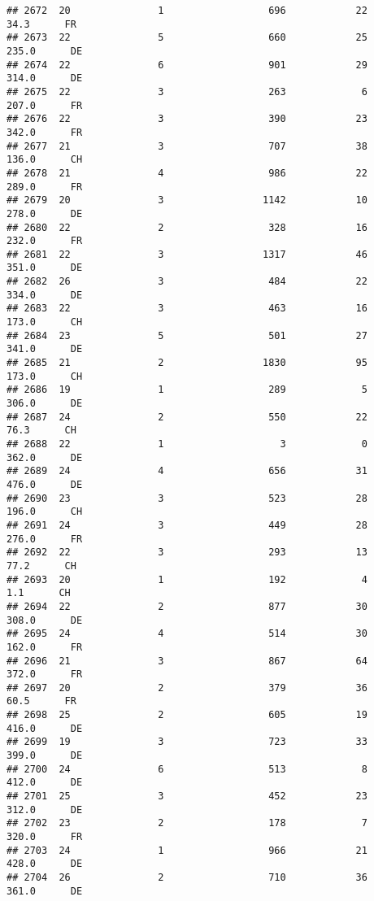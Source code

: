 \documentclass[
]{article}
\begin{document}
\begin{verbatim}
## 2672  20               1                  696            22     34.3      FR
## 2673  22               5                  660            25    235.0      DE
## 2674  22               6                  901            29    314.0      DE
## 2675  22               3                  263             6    207.0      FR
## 2676  22               3                  390            23    342.0      FR
## 2677  21               3                  707            38    136.0      CH
## 2678  21               4                  986            22    289.0      FR
## 2679  20               3                 1142            10    278.0      DE
## 2680  22               2                  328            16    232.0      FR
## 2681  22               3                 1317            46    351.0      DE
## 2682  26               3                  484            22    334.0      DE
## 2683  22               3                  463            16    173.0      CH
## 2684  23               5                  501            27    341.0      DE
## 2685  21               2                 1830            95    173.0      CH
## 2686  19               1                  289             5    306.0      DE
## 2687  24               2                  550            22     76.3      CH
## 2688  22               1                    3             0    362.0      DE
## 2689  24               4                  656            31    476.0      DE
## 2690  23               3                  523            28    196.0      CH
## 2691  24               3                  449            28    276.0      FR
## 2692  22               3                  293            13     77.2      CH
## 2693  20               1                  192             4      1.1      CH
## 2694  22               2                  877            30    308.0      DE
## 2695  24               4                  514            30    162.0      FR
## 2696  21               3                  867            64    372.0      FR
## 2697  20               2                  379            36     60.5      FR
## 2698  25               2                  605            19    416.0      DE
## 2699  19               3                  723            33    399.0      DE
## 2700  24               6                  513             8    412.0      DE
## 2701  25               3                  452            23    312.0      DE
## 2702  23               2                  178             7    320.0      FR
## 2703  24               1                  966            21    428.0      DE
## 2704  26               2                  710            36    361.0      DE

\end{verbatim}
\end{document}
